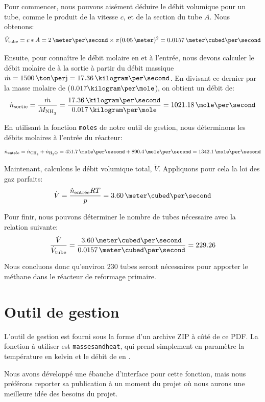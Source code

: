 Pour commencer, nous pouvons aisément déduire le débit volumique pour un tube,
comme le produit de la vitesse $c$, et de la section du tube $A$.
Nous obtenons:
\begin{equation*}
\dot{V}\ind{tube} = c*A = 2\,\meter\per\second \times \pi(0.05\,\meter)^2
= 0.0157\,\meter\cubed\per\second
\end{equation*}

Ensuite, pour connaître le débit molaire en  et  à l'entrée, nous devons calculer le débit molaire de  à la sortie
à partir du débit massique $\dot{m} = 1500\,\ton\per\jour = 17.36\,\kilogram\per\second$.
En divisant ce dernier par la masse molaire de  ($0.017\kilogram\per\mole$),
on obtient un débit de:
\begin{equation*}
\dot{n}\ind{sortie} = \frac{\dot{m}}{M_{\ce{NH3}}}
= \frac{17.36\,\kilogram\per\second}{0.017\,\kilogram\per\mole}
= 1021.18\,\mole\per\second
\end{equation*}

En utilisant la fonction \texttt{moles} de notre outil de gestion,
nous déterminons les débits molaires à l'entrée du réacteur:
\begin{equation*}
\dot{n}\ind{entrée} =  \dot{n}\ind{\ce{CH4}}+ \dot{n}\ind{\ce{H2O}}=451.7\,\mole\per\second + 890.4\,\mole\per\second = 1342.1 \,\mole\per\second
\end{equation*}

Maintenant, calculons le débit volumique total, $\dot{V}$.
Appliquons pour cela la loi des gaz parfaits:
\begin{equation*}
\dot{V} = \frac{\dot{n}\ind{entrée}RT}{p} = 3.60\,\meter\cubed\per\second
\end{equation*}

Pour finir, nous pouvons déterminer
le nombre de tubes nécessaire avec la relation suivante:
\begin{equation*}
\frac{\dot{V}}{\dot{V}\ind{tube}}
= \frac{3.60\,\meter\cubed\per\second}{0.0157\,\meter\cubed\per\second} = 229.26
\end{equation*}

Nous concluons donc qu'environ 230 tubes seront nécessaires pour apporter le méthane
dans le réacteur de reformage primaire.

\section{Outil de gestion}

L'outil de gestion est fourni sous la forme d'un archive ZIP à côté de ce PDF.
La fonction à utiliser est \texttt{masses\textunderscore and\textunderscore heat},
qui prend simplement en paramètre la température en kelvin et le débit
de  en \kilogram\per\second.

Nous avons développé une ébauche d'interface pour cette fonction,
mais nous préférons reporter sa publication à un moment du projet où nous aurons
une meilleure idée des besoins du projet.
